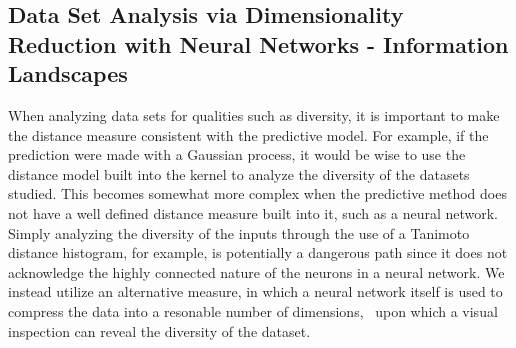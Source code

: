 \documentclass{pnastwo}
\begin{document}
\begin{article}
\subsection{Data Set Analysis via Dimensionality Reduction with Neural Networks - Information Landscapes}
When analyzing data sets for qualities such as diversity, it is important to make the distance measure consistent with the predictive model.  For example, if the prediction were made with a Gaussian process, it would be wise to use the distance model built into the kernel to analyze the diversity of the datasets studied.  This becomes somewhat more complex when the predictive method does not have a well defined distance measure built into it, such as a neural network.  Simply analyzing the diversity of the inputs through the use of a Tanimoto distance histogram, for example, is potentially a dangerous path since it does not acknowledge the highly connected nature of the neurons in a neural network.  We instead utilize an alternative measure, in which a neural network itself is used to compress the data into a resonable number of dimensions,~\cite{hinton_reducing_2006} upon which a visual inspection can reveal the diversity of the dataset.


\end{article}
\end{document}
